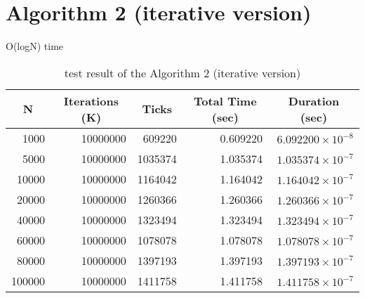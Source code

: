 \section{Algorithm 2 (iterative version)}
O(logN) time
\begin{table}[H]
	\centering
	\caption{test result of the Algorithm 2 (iterative version)}
	\begin{tabular}{|r|r|r|r|r|}
		\hline
		\multicolumn{1}{|c|}{N} &
		\multicolumn{1}{|c|}{Iterations (K)} &
		\multicolumn{1}{|c|}{Ticks} &
		\multicolumn{1}{|c|}{Total Time (sec)} &
		\multicolumn{1}{|c|}{Duration (sec)} \\
		\hline
		1000 & 10000000 & 609220 & 0.609220 & $6.092200 \times 10 ^ {-8}$ \\
		\hline
		5000 & 10000000 & 1035374 & 1.035374 & $1.035374 \times 10 ^ {-7}$ \\
		\hline
		10000 & 10000000 & 1164042 & 1.164042 & $1.164042 \times 10 ^ {-7}$ \\
		\hline
		20000 & 10000000 & 1260366 & 1.260366 & $1.260366 \times 10 ^ {-7}$ \\
		\hline
		40000 & 10000000 & 1323494 & 1.323494 & $1.323494 \times 10 ^ {-7}$ \\
		\hline
		60000 & 10000000 & 1078078 & 1.078078 & $1.078078 \times 10 ^ {-7}$ \\
		\hline
		80000 & 10000000 & 1397193 & 1.397193 & $1.397193 \times 10 ^ {-7}$ \\
		\hline
		100000 & 10000000 & 1411758 & 1.411758 & $1.411758 \times 10 ^ {-7}$ \\
		\hline
	\end{tabular}
\end{table}
